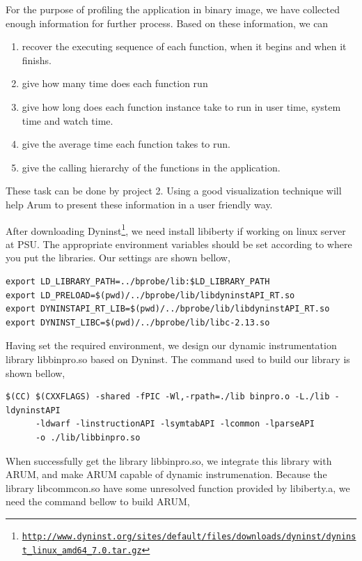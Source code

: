 \documentclass[11pt,letterpaper,oneside]{article}
\begin{document}
For the purpose of profiling the application in binary image, we have collected enough information for further process. Based on these information, we can
\begin{enumerate}
\item recover the executing sequence of each function, when it begins and when it finishs.
\item give how many time does each function run
\item give how long does each function instance take to run in user time, system time and watch time.
\item give the average time each function takes to run.
\item give the calling hierarchy of the functions in the application.
\end{enumerate}
These task can be done by project 2. Using a good visualization technique will help Arum to present these information in a user friendly way.

After downloading Dyninst\footnote{\texttt{\url{http://www.dyninst.org/sites/default/files/downloads/dyninst/dyninst_linux_amd64_7.0.tar.gz}}}, we need install libiberty if working on linux server at PSU. The appropriate environment variables should be set according to where you put the libraries. Our settings are shown bellow,

\begin{Verbatim}[frame=single]
export LD_LIBRARY_PATH=../bprobe/lib:$LD_LIBRARY_PATH
export LD_PRELOAD=$(pwd)/../bprobe/lib/libdyninstAPI_RT.so
export DYNINSTAPI_RT_LIB=$(pwd)/../bprobe/lib/libdyninstAPI_RT.so
export DYNINST_LIBC=$(pwd)/../bprobe/lib/libc-2.13.so
\end{Verbatim}

Having set the required environment, we design our dynamic instrumentation library libbinpro.so based on Dyninst. The command used to build our library is shown bellow,

\begin{Verbatim}[frame=single]
$(CC) $(CXXFLAGS) -shared -fPIC -Wl,-rpath=./lib binpro.o -L./lib -ldyninstAPI
      -ldwarf -linstructionAPI -lsymtabAPI -lcommon -lparseAPI
      -o ./lib/libbinpro.so
\end{Verbatim}

When successfully get the library libbinpro.so, we integrate this library with ARUM, and make ARUM capable of dynamic instrumenation. Because the library libcommcon.so have some unresolved function provided by libiberty.a, we need the command bellow to build ARUM,
\end{document}
